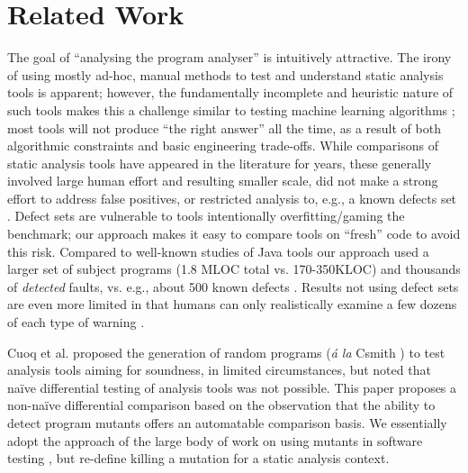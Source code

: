 \section{Related Work}

The goal of ``analysing the program analyser'' \cite{cadar2016analysing} is intuitively attractive.  The irony of using mostly ad-hoc, manual methods to test and understand static analysis tools is apparent; however, the fundamentally incomplete and heuristic nature of such tools makes this a challenge similar to testing machine learning algorithms \cite{OnlyOracle}; most tools will not produce ``the right answer'' all the time, as a result of both algorithmic constraints and basic engineering trade-offs.  While comparisons of static analysis tools \cite{CompareJavaTools,durieux2019empirical, Parizi,slither,pashchenko2017delta} have appeared in the literature for years, these generally involved large human effort and resulting smaller scale, did not make a strong effort to address false positives, or restricted analysis to, e.g., a known defects set \cite{AllBugs, do2016toward}.  Defect sets are vulnerable to tools intentionally overfitting/gaming the benchmark; our approach makes it easy to compare tools on ``fresh'' code to avoid this risk.  Compared to well-known studies of Java tools \cite{AllBugs,CompareJavaTools} our approach used a larger set of subject programs (1.8 MLOC total vs. 170-350KLOC) and thousands of \emph{detected} faults, vs. e.g., about 500 known defects \cite{AllBugs}.  Results not using defect sets are even more limited in that humans can only realistically examine a few dozens of each type of warning \cite{CompareJavaTools}.

Cuoq et al. \cite{regehrRandom} proposed the generation of random programs (\emph{\'a la} Csmith \cite{csmith}) to test analysis tools aiming for soundness, in limited circumstances, but noted that na\"ive differential testing of analysis tools was not possible.  This paper proposes a non-na\"ive differential comparison based on the observation that the ability to detect program mutants offers an automatable comparison basis.  We essentially adopt the approach of the large body of work on using mutants in software testing \cite{jia2011analysis,demillo1978hints,budd1980theoretical, groce2015verified,groce2018verified,MutGoogle,ivankovic2018industrial,mutKernel}, but re-define killing a mutation for a static analysis context.

